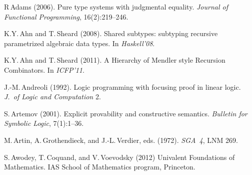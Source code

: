 \documentclass[11pt,twocolumn]{article}
\begin{document}
{\footnotesize
\begin{thebibliography}{000}


R\,Adams (2006).
\newblock Pure type systems with judgmental equality.
\newblock \emph{Journal of Functional Programming}, 16(2):219--246.

K.Y.\,Ahn and T.\,Sheard (2008).
\newblock Shared subtypes: subtyping recursive parametrized algebraic data
types.  
\newblock In \emph{Haskell'08}.  

K.Y.\,Ahn and T.\,Sheard (2011).
\newblock A Hierarchy of Mendler style Recursion Combinators. 
\newblock In \emph{ICFP'11}.  




J.-M.\,Andreoli (1992).
\newblock Logic programming with focusing proof in linear logic.
\newblock \emph{J.\ of Logic and Computation} 2.

S.\,Artemov (2001).
\newblock Explicit provability and constructive semantics.
\newblock \emph{Bulletin for Symbolic Logic}, 7(1):1--36.


M.\,Artin, A.\,Grothendieck, and J.-L.\,Verdier, eds. (1972).
\newblock \emph{SGA~4}, LNM 269. 

S.\,Awodey, T.\,Coquand, and V.\,Voevodsky (2012)
\newblock Univalent Foundations of Mathematics.
\newblock IAS School of Mathematics program, Princeton.


\end{thebibliography}}
\end{document}
